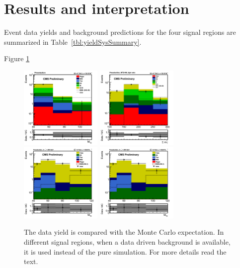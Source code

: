 \section{Results and interpretation}
\label{sect:stat}
Event data yields and background predictions for the four signal regions are summarized in Table~\ref{tbl:yieldSysSummary}.

Figure \ref{fig:yield_final}
\begin{figure}[!Hhtb]
\centering
\includegraphics[width=0.35\textwidth,keepaspectratio=true]{StatisticsFig/QCDWestimation_plot.png}
\includegraphics[width=0.35\textwidth,keepaspectratio=true]{StatisticsFig/QCDestimation_plot.png}
\includegraphics[width=0.35\textwidth,keepaspectratio=true]{StatisticsFig/MT2_tauMTgt200_DDFake.png}
\includegraphics[width=0.35\textwidth,keepaspectratio=true]{StatisticsFig/MT2_tauMTgt200_DDFake.png}
\caption{The data yield is compared with the Monte Carlo expectation. In different signal regions, 
when a data driven background is available, it is used instead of the pure simulation. For more details read the text.}
\label{fig:yield_final}
\end{figure}

